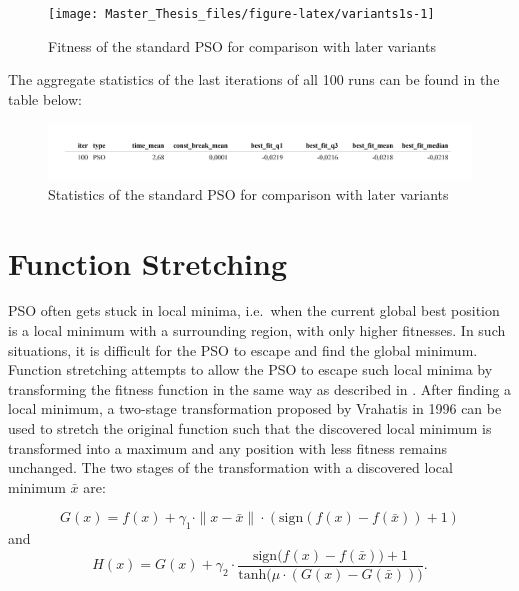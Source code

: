 \documentclass[
  oneside, a4paper, 12pt, openany]{book}
\theoremstyle{definition}
\theoremstyle{definition}
\theoremstyle{definition}
\theoremstyle{definition}
\theoremstyle{remark}
\begin{document}
\begin{figure}[H]
\texttt{[image: Master\_Thesis\_files/figure-latex/variants1s-1]} \caption{Fitness of the standard PSO for comparison with later variants}\label{fig:variants1s}
\end{figure}

The aggregate statistics of the last iterations of all 100 runs can be found in the table below:

\begin{figure}[H]
\includegraphics{Master_Thesis_files/figure-latex/variants2-1} \caption{Statistics of the standard PSO for comparison with later variants}\label{fig:variants2}
\end{figure}

\hypertarget{function-stretching}{%
\section{Function Stretching}\label{function-stretching}}

PSO often gets stuck in local minima, i.e.~when the current global best position is a local minimum with a surrounding region, with only higher fitnesses. In such situations, it is difficult for the PSO to escape and find the global minimum. Function stretching attempts to allow the PSO to escape such local minima by transforming the fitness function in the same way as described in \citep{PaVr2002}. After finding a local minimum, a two-stage transformation proposed by Vrahatis in 1996 can be used to stretch the original function such that the discovered local minimum is transformed into a maximum and any position with less fitness remains unchanged. The two stages of the transformation with a discovered local minimum \(\bar{x}\) are:

\begin{equation} 
G(x) = f(x) +  \gamma_1 \cdot \| x-\bar{x} \| \cdot (\text{sign}(f(x)-f(\bar{x}))+1)
\label{eq:fnstretchG}
\end{equation}
and
\begin{equation} 
  H(x) = G(x) + \gamma_2 \cdot \frac{\text{sign}\biggl(f(x)-f(\bar{x})\biggr)+1}{\text{tanh}\biggl( \mu \cdot (G(x)-G(\bar{x})) \biggr)}.
\label{eq:fnstretchH}
\end{equation}
\end{document}
